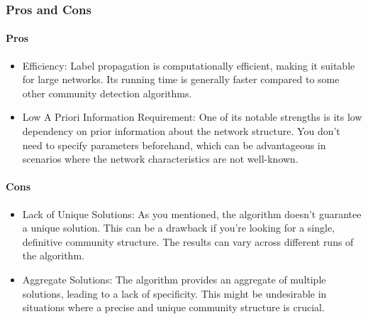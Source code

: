 \subsubsection{Pros and Cons}
\paragraph{Pros}
\begin{itemize}
    \item Efficiency: Label propagation is computationally efficient, making it suitable for large networks. Its running time is generally faster compared to some other community detection algorithms.
    \item Low A Priori Information Requirement: One of its notable strengths is its low dependency on prior information about the network structure. You don't need to specify parameters beforehand, which can be advantageous in scenarios where the network characteristics are not well-known.
\end{itemize}
\paragraph{Cons}
\begin{itemize}
    \item Lack of Unique Solutions: As you mentioned, the algorithm doesn't guarantee a unique solution. This can be a drawback if you're looking for a single, definitive community structure. The results can vary across different runs of the algorithm.
    \item Aggregate Solutions: The algorithm provides an aggregate of multiple solutions, leading to a lack of specificity. This might be undesirable in situations where a precise and unique community structure is crucial.
\end{itemize}

